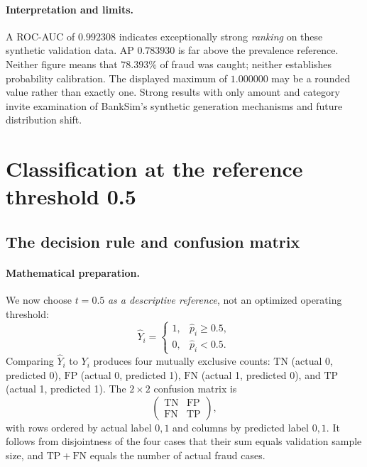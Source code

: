 \documentclass[11pt,a4paper]{article}
\begin{document}
\paragraph{Interpretation and limits.} A ROC-AUC of $0.992308$ indicates exceptionally strong \emph{ranking} on these synthetic validation data. AP $0.783930$ is far above the prevalence reference. Neither figure means that $78.393\%$ of fraud was caught; neither establishes probability calibration. The displayed maximum of $1.000000$ may be a rounded value rather than exactly one. Strong results with only amount and category invite examination of BankSim's synthetic generation mechanisms and future distribution shift.

\section{Classification at the reference threshold 0.5}
\subsection{The decision rule and confusion matrix}
\paragraph{Mathematical preparation.} We now choose $t=0.5$ \emph{as a descriptive reference}, not an optimized operating threshold:
\begin{equation}\label{eq:threshold}\widehat Y_i=\begin{cases}1,&\hat p_i\ge0.5,\\0,&\hat p_i<0.5.\end{cases}\end{equation}
Comparing $\widehat Y_i$ to $Y_i$ produces four mutually exclusive counts: $\mathrm{TN}$ (actual 0, predicted 0), $\mathrm{FP}$ (actual 0, predicted 1), $\mathrm{FN}$ (actual 1, predicted 0), and $\mathrm{TP}$ (actual 1, predicted 1). The $2\times2$ confusion matrix is
\begin{equation}\label{eq:cm}\begin{pmatrix}\mathrm{TN}&\mathrm{FP}\\\mathrm{FN}&\mathrm{TP}\end{pmatrix},\end{equation}
with rows ordered by actual label $0,1$ and columns by predicted label $0,1$. It follows from disjointness of the four cases that their sum equals validation sample size, and $\mathrm{TP}+\mathrm{FN}$ equals the number of actual fraud cases.
\end{document}
